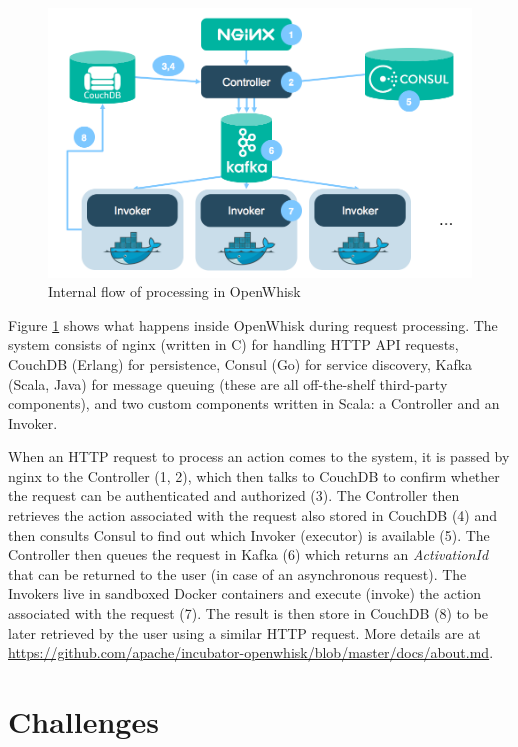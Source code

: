 \begin{figure}[htb]
\centering
\includegraphics[scale=0.4]{./OpenWhisk_flow_of_processing}
\caption{Internal flow of processing in OpenWhisk}
\label{fig:owflow}
\end{figure}

Figure \ref{fig:owflow} shows what happens inside OpenWhisk during request processing. The system consists of nginx (written in C) for handling HTTP API requests, CouchDB (Erlang) for persistence, Consul (Go) for service discovery, Kafka (Scala, Java) for message queuing (these are all off-the-shelf third-party components), and two custom components written in Scala: a Controller and an Invoker.

When an HTTP request to process an action comes to the system, it is passed by nginx to the Controller (1, 2), which then talks to CouchDB to confirm whether the request can be authenticated and authorized (3). The Controller then retrieves the action associated with the request also stored in CouchDB (4) and then consults Consul to find out which Invoker (executor) is available (5). The Controller then queues the request in Kafka (6) which returns an \emph{ActivationId} that can be returned to the user (in case of an asynchronous request). The Invokers live in sandboxed Docker containers and execute (invoke) the action associated with the request (7). The result is then store in CouchDB (8) to be later retrieved by the user using a similar HTTP request. More details are at \url{https://github.com/apache/incubator-openwhisk/blob/master/docs/about.md}.

\section{Challenges}

